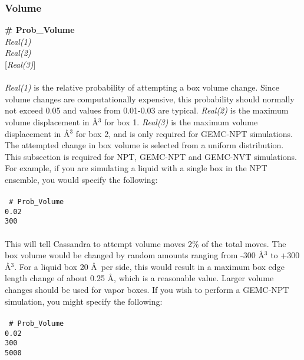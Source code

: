 \subsubsection{Volume}
{\bf \# Prob\_Volume} \\
{\it Real(1)} \\ 
{\it Real(2)} \\
{[}{\it Real(3)}] \\ \\
%
{\it Real(1)} is the relative probability of attempting a box volume change. 
Since volume changes are computationally expensive, this probability should 
normally not exceed 0.05 and values from 0.01-0.03 are typical. 
{\it Real(2)} is the maximum volume displacement in \AA$^3$ for box 1.
{\it Real(3)} is the maximum volume displacement in \AA$^3$ for box 2, 
and is only required for GEMC-NPT simulations.
The attempted change in box volume is selected from a uniform distribution. 
This subsection is required for NPT, GEMC-NPT and GEMC-NVT simulations. 
%
For example, if you are simulating a liquid with a single box in the NPT ensemble,
you would specify the following: \\ \\ 
%                                                                                                                                            
\texttt{
\# Prob\_Volume \\
0.02 \\
300} \\ \\
%                                                                                                                                           
This will tell Cassandra to attempt volume moves 2\% of the
total moves. The box volume would be changed by random amounts ranging from
-300 \AA$^3$ to +300 \AA$^3$. For a liquid box 20 \AA\ per side,
this would result in a maximum box edge length change of about 0.25
\AA, which is a reasonable value.  
Larger volume changes should be used for vapor boxes. 
%
If you wish to perform a GEMC-NPT simulation, you might specify the
following: \\ \\ 
%                                                                                                                                           
\texttt{
\# Prob\_Volume \\
0.02 \\
300 \\
5000} \\ \\
